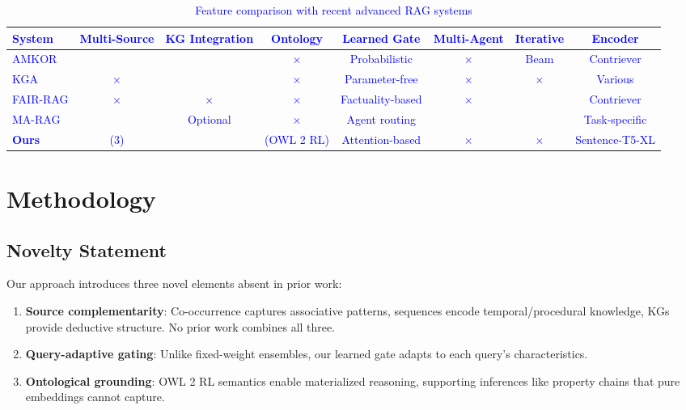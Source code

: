 \documentclass[10pt,twocolumn]{article}
\newcommand{\revision}[1]{\textcolor{blue}{#1}}
\begin{document}
\revision{
\begin{table}[t]
\centering
\caption{Feature comparison with recent advanced RAG systems}
\label{tab:recent_comparison}
\small
\begin{tabular}{@{}lccccccc@{}}
\toprule
\textbf{System} & \textbf{Multi-Source} & \textbf{KG Integration} & \textbf{Ontology} & \textbf{Learned Gate} & \textbf{Multi-Agent} & \textbf{Iterative} & \textbf{Encoder} \\
\midrule
AMKOR \cite{fang2024amkor} & \checkmark & \checkmark & $\times$ & Probabilistic & $\times$ & Beam & Contriever \\
KGA \cite{wang2024kga} & $\times$ & \checkmark & $\times$ & Parameter-free & $\times$ & $\times$ & Various \\
FAIR-RAG \cite{chen2024fairrag} & $\times$ & $\times$ & $\times$ & Factuality-based & $\times$ & \checkmark & Contriever \\
MA-RAG \cite{li2024marag} & \checkmark & Optional & $\times$ & Agent routing & \checkmark & \checkmark & Task-specific \\
\textbf{Ours} & \checkmark (3) & \checkmark & \checkmark (OWL 2 RL) & Attention-based & $\times$ & $\times$ & Sentence-T5-XL \\
\bottomrule
\end{tabular}
\end{table}
}

\section{Methodology}
\label{sec:method}

\subsection{Novelty Statement}
\label{sec:novelty}

Our approach introduces three novel elements absent in prior work:

\begin{enumerate}
    \item \textbf{Source complementarity}: Co-occurrence captures associative patterns, sequences encode temporal/procedural knowledge, KGs provide deductive structure. No prior work combines all three.
    \item \textbf{Query-adaptive gating}: Unlike fixed-weight ensembles, our learned gate adapts to each query's characteristics.
    \item \textbf{Ontological grounding}: OWL 2 RL semantics enable materialized reasoning, supporting inferences like property chains that pure embeddings cannot capture.
\end{enumerate}
\end{document}
